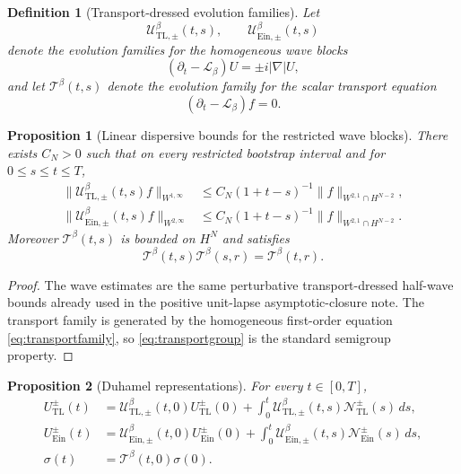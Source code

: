 \documentclass[11pt]{article}
\newcommand{\Ell}{\mathcal{L}}
\newtheorem{definition}{Definition}
\newtheorem{proposition}{Proposition}
\begin{document}
\begin{definition}[Transport-dressed evolution families]
\label{def:families}
Let
\[
\mathcal U_{\mathrm{TL},\pm}^\beta(t,s),
\qquad
\mathcal U_{\mathrm{Ein},\pm}^\beta(t,s)
\]
denote the evolution families for the homogeneous wave blocks
\begin{equation}
(\partial_t-\Ell_\beta)U=\pm i|\nabla|U,
\label{eq:wavefamily}
\end{equation}
and let \(\mathcal T^\beta(t,s)\) denote the evolution family for the scalar transport equation
\begin{equation}
(\partial_t-\Ell_\beta)f=0.
\label{eq:transportfamily}
\end{equation}
\end{definition}

\begin{proposition}[Linear dispersive bounds for the restricted wave blocks]
\label{prop:lin}
There exists \(C_N>0\) such that on every restricted bootstrap interval and for \(0\le s\le t\le T\),
\begin{align}
\|\mathcal U_{\mathrm{TL},\pm}^\beta(t,s)f\|_{W^{1,\infty}}
&\le
C_N(1+t-s)^{-1}\|f\|_{W^{2,1}\cap H^{N-2}},
\label{eq:linTL}
\\
\|\mathcal U_{\mathrm{Ein},\pm}^\beta(t,s)f\|_{W^{2,\infty}}
&\le
C_N(1+t-s)^{-1}\|f\|_{W^{2,1}\cap H^{N-2}}.
\label{eq:linEin}
\end{align}
Moreover \(\mathcal T^\beta(t,s)\) is bounded on \(H^N\) and satisfies
\begin{equation}
\mathcal T^\beta(t,s)\mathcal T^\beta(s,r)=\mathcal T^\beta(t,r).
\label{eq:transportgroup}
\end{equation}
\end{proposition}

\begin{proof}
The wave estimates are the same perturbative transport-dressed half-wave bounds already used in the positive unit-lapse asymptotic-closure note. The transport family is generated by the homogeneous first-order equation \eqref{eq:transportfamily}, so \eqref{eq:transportgroup} is the standard semigroup property.
\end{proof}

\begin{proposition}[Duhamel representations]
\label{prop:duhamel}
For every \(t\in[0,T]\),
\begin{align}
U_{\mathrm{TL}}^\pm(t)
&=
\mathcal U_{\mathrm{TL},\pm}^\beta(t,0)U_{\mathrm{TL}}^\pm(0)
+ \int_0^t \mathcal U_{\mathrm{TL},\pm}^\beta(t,s)\mathcal N_{\mathrm{TL}}^\pm(s)\,ds,
\label{eq:duhTL}
\\
U_{\mathrm{Ein}}^\pm(t)
&=
\mathcal U_{\mathrm{Ein},\pm}^\beta(t,0)U_{\mathrm{Ein}}^\pm(0)
+ \int_0^t \mathcal U_{\mathrm{Ein},\pm}^\beta(t,s)\mathcal N_{\mathrm{Ein}}^\pm(s)\,ds,
\label{eq:duhEin}
\\
\sigma(t)
&=
\mathcal T^\beta(t,0)\sigma(0).
\label{eq:duhSigma}
\end{align}
\end{proposition}
\end{document}
